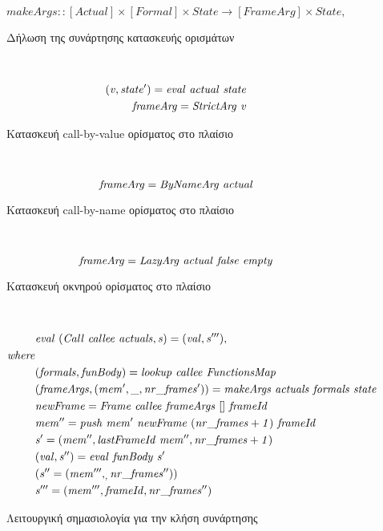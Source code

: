 \documentclass[diploma]{softlab-thesis}
\begin{document}
  \begin{figure}[htp]
    \[ \mathit{makeArgs :: [Actual] \times [Formal] \times State \rightarrow [FrameArg] \times State}, \]
  \caption{Δήλωση της συνάρτησης κατασκευής ορισμάτων\label{fig:makeArgs-el}}
  \end{figure} ~
  \begin{figure}[htp]
    \begin{align*}
      \mathit{(v, state') = eval \hfill\ actual \hfill\ state} \\
      \mathit{frameArg = StrictArg \hfill\ v}
    \end{align*}
  \caption{Κατασκευή call-by-value ορίσματος στο πλαίσιο\label{fig:makeCBVArg-el}}
  \end{figure} ~
  \begin{figure}[htp]
    \[ 
      \mathit{frameArg = ByNameArg \hfill\ actual} 
    \] 
  \caption{Κατασκευή call-by-name ορίσματος στο πλαίσιο\label{fig:makeCBNArg-el}}
  \end{figure} ~
  \begin{figure}[htp]
    \[
      \mathit{frameArg = LazyArg \hfill\ actual \hfill\ false \hfill\ empty} 
    \]
  \caption{Κατασκευή οκνηρού ορίσματος στο πλαίσιο\label{fig:lazyArgConstruction-el}}
  \end{figure} ~
  \begin{figure}[htp]
    \begin{align*}
      & \mathit{eval \hfill\ (Call \hfill\ callee \hfill\ actuals, s) = (val, s'''),} \\ \mathit{where} \\
      & \mathit{(formals, funBody) = lookup \hfill\ callee \hfill\ FunctionsMap} \\
      & \mathit{(frameArgs, (mem', \_, nr\_frames')) = makeArgs \hfill\ actuals \hfill\ formals  \hfill\ state} \\
      & \mathit{newFrame = Frame \hfill\ callee \hfill\ frameArgs \hfill\ [] \hfill\ frameId} \\
      & \mathit{mem'' = push \hfill\ mem' \hfill\ newFrame \hfill\ (nr\_frames + 1) \hfill\ frameId} \\
      & \mathit{s' = (mem'', lastFrameId \hfill\ mem'', nr\_frames + 1)} \\
      & \mathit{(val, s'') = eval \hfill\ funBody \hfill\ s'} \\
      & \mathit{(s'' = (mem''', _, nr\_frames''))} \\
      & \mathit{s''' = (mem''', frameId, nr\_frames'')}
    \end{align*}
  \caption{Λειτουργική σημασιολογία για την κλήση συνάρτησης\label{fig:functionCall-el}}
  \end{figure}
  
\end{document}
